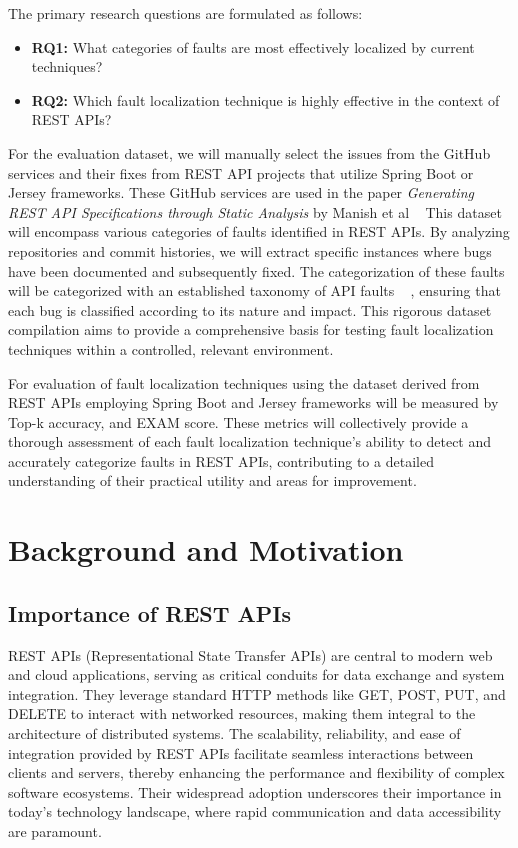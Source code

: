 \documentclass[conference]{IEEEtran}
\begin{document}
    The primary research questions are formulated as follows:
    \begin{itemize}
        \item \textbf{RQ1:} What categories of faults are most effectively localized by current techniques?
        \item \textbf{RQ2:} Which fault localization technique is highly effective in the context of REST APIs?
    \end{itemize}

For the evaluation dataset, we will manually select the issues from the GitHub services and their fixes from REST API projects that utilize Spring Boot or Jersey frameworks. These GitHub services are used in the paper  \textit{Generating REST API Specifications through Static Analysis} by Manish et al ~\cite{ManishRestServices}
This dataset will encompass various categories of faults identified in REST APIs. By analyzing repositories and commit histories, we will extract specific instances where bugs have been documented and subsequently fixed. 
The categorization of these faults will be categorized with an established taxonomy of API faults ~\cite{automatedTestTaxonomy} , ensuring that each bug is classified according to its nature and impact. This rigorous dataset compilation aims to provide a comprehensive basis for testing fault localization techniques within a controlled, relevant environment.


For evaluation of fault localization techniques using the dataset derived from REST APIs employing Spring Boot and Jersey frameworks will be measured by Top-k accuracy, and EXAM score.
These metrics will collectively provide a thorough assessment of each fault localization technique's ability to detect and accurately categorize faults in REST APIs, contributing to a detailed understanding of their practical utility and areas for improvement.

\section{Background and Motivation}
\label{sec:background-and-motivation}

\subsection{Importance of REST APIs}

REST APIs (Representational State Transfer APIs) are central to modern web and cloud applications, serving as critical conduits for data exchange and system integration. 
They leverage standard HTTP methods like GET, POST, PUT, and DELETE to interact with networked resources, making them integral to the architecture of distributed systems. 
The scalability, reliability, and ease of integration provided by REST APIs facilitate seamless interactions between clients and servers, thereby enhancing the performance and flexibility of complex software ecosystems. 
Their widespread adoption underscores their importance in today's technology landscape, where rapid communication and data accessibility are paramount.
\end{document}
